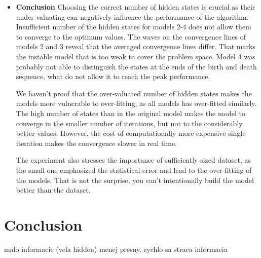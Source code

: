 \documentclass[thesis=M,english]{FITthesis}[2012/10/20]
\begin{document}
\begin{itemize}
\item \textbf{ Conclusion }
Choosing the correct number of hidden states is crucial as their under-valuating can negatively influence the performance of the algorithm. Insufficient number of the hidden states for models 2-4 does not allow them to converge to the optimum values. The waves on the convergence lines of models 2 and 3 reveal that the averaged convergence lines differ. That marks the instable model that is too weak to cover the problem space. Model 4 was probably not able to distinguish the states at the ends of the birth and death sequence, what do not allow it to reach the peak performance.

We haven't proof that the over-valuated number of hidden states makes the models more vulnerable to over-fitting, as all models has over-fitted similarly. The high number of states than in the original model makes the model to converge in the smaller number of iterations, but not to the considerably better values. However, the cost of computationally more expensive single iteration makes the convergence slower in real time.

The experiment also stresses the importance of sufficiently sized dataset, as the small one emphasized the statistical error and lead to the over-fitting of the models. That is not the surprise, you can't intentionally build the model better than the dataset. 
\end{itemize}








\chapter{Conclusion}

malo informacie (vela hidden) menej presny.
rychlo sa straca informacia 
\end{document}
